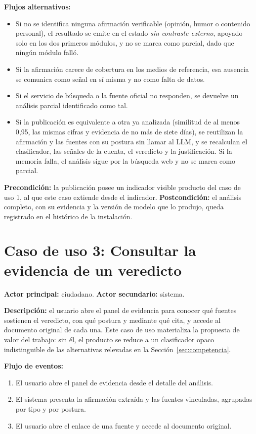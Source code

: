 \textbf{Flujos alternativos:}
\begin{itemize}
  \item Si no se identifica ninguna afirmación verificable (opinión, humor o contenido personal), el resultado se emite en el estado \emph{sin contraste externo}, apoyado solo en los dos primeros módulos, y no se marca como parcial, dado que ningún módulo falló.
  \item Si la afirmación carece de cobertura en los medios de referencia, esa ausencia se comunica como señal en sí misma y no como falta de datos.
  \item Si el servicio de búsqueda o la fuente oficial no responden, se devuelve un análisis parcial identificado como tal.
  \item Si la publicación es equivalente a otra ya analizada (similitud de al menos 0,95, las mismas cifras y evidencia de no más de siete días), se reutilizan la afirmación y las fuentes con su postura sin llamar al LLM, y se recalculan el clasificador, las señales de la cuenta, el veredicto y la justificación. Si la memoria falla, el análisis sigue por la búsqueda web y no se marca como parcial.
\end{itemize}

\textbf{Precondición:} la publicación posee un indicador visible producto del caso de uso 1, al que este caso extiende desde el indicador.
\textbf{Postcondición:} el análisis completo, con su evidencia y la versión de modelo que lo produjo, queda registrado en el histórico de la instalación.

\section*{Caso de uso 3: Consultar la evidencia de un veredicto}

\textbf{Actor principal:} ciudadano. \textbf{Actor secundario:} sistema.

\textbf{Descripción:} el usuario abre el panel de evidencia para conocer qué fuentes sostienen el veredicto, con qué postura y mediante qué cita, y accede al documento original de cada una. Este caso de uso materializa la propuesta de valor del trabajo: sin él, el producto se reduce a un clasificador opaco indistinguible de las alternativas relevadas en la Sección~\ref{sec:competencia}.

\textbf{Flujo de eventos:}
\begin{enumerate}
  \item El usuario abre el panel de evidencia desde el detalle del análisis.
  \item El sistema presenta la afirmación extraída y las fuentes vinculadas, agrupadas por tipo y por postura.
  \item El usuario abre el enlace de una fuente y accede al documento original.
\end{enumerate}


